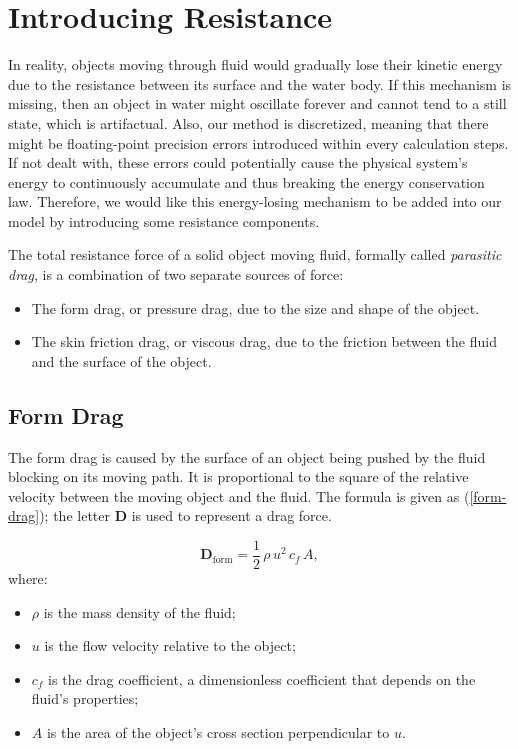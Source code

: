 \section{Introducing Resistance}

In reality, objects moving through fluid would gradually lose their kinetic energy due to the resistance between its surface and the water body.
If this mechanism is missing, then an object in water might oscillate forever and cannot tend to a still state, which is artifactual.
Also, our method is discretized, meaning that there might be floating-point precision errors introduced within every calculation steps.
If not dealt with, these errors could potentially cause the physical system's energy to continuously accumulate and thus breaking the energy conservation law.
Therefore, we would like this energy-losing mechanism to be added into our model by introducing some resistance components.

The total resistance force of a solid object moving fluid, formally called \emph{parasitic drag}, is a combination of two separate sources of force:
\begin{itemize}
	\item The form drag, or pressure drag, due to the size and shape of the object.
	\item The skin friction drag, or viscous drag, due to the friction between the fluid and the surface of the object.
\end{itemize}

\subsection{Form Drag}

The form drag is caused by the surface of an object being pushed by the fluid blocking on its moving path.
It is proportional to the square of the relative velocity between the moving object and the fluid.
The formula is given as (\ref{form-drag}); the letter $\mathbf{D}$ is used to represent a drag force.

\begin{equation}
	\mathbf{D}_{\text{form}}=\frac{1}{2}\,\rho\,u^2\,c_f\,A,
	\label{form-drag}
\end{equation}
where:
\begin{itemize}
	\item $\rho$ is the mass density of the fluid;
	\item $u$ is the flow velocity relative to the object;
	\item $c_f$ is the drag coefficient, a dimensionless coefficient that depends on the fluid's properties;
	\item $A$ is the area of the object's cross section perpendicular to $u$.
\end{itemize}

